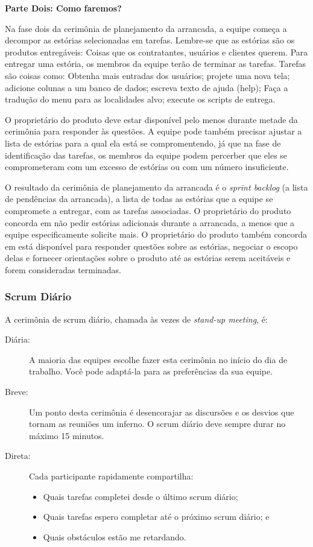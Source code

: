 \documentclass[
	11pt,				%
	openright,
	twoside,			%
	a4paper,			%
	english,			%
	french,
	brazil,				%
	sumario=tradicional
	]{abntex2}
\begin{document}
\noindent \textbf{\small Parte Dois: Como faremos?}

Na fase dois da cerimônia de planejamento da arrancada, a equipe começa a decompor as estórias selecionadas em tarefas. Lembre-se que as estórias são os produtos entregáveis: Coisas que os contratantes, usuários e clientes querem. Para entregar uma estória, os membros da equipe terão de terminar as tarefas. Tarefas são coisas como: Obtenha mais entradas dos usuários; projete uma nova tela; adicione colunas a um banco de dados; escreva texto de ajuda (help); Faça a tradução do menu para as localidades alvo; execute os scripts de entrega.

O proprietário do produto deve estar disponível pelo menos durante metade da cerimônia para responder às questões. A equipe pode também precisar ajustar a lista de estórias para a qual ela está se compromentendo, já que na fase de identificação das tarefas, os membros da equipe podem percerber que eles se comprometeram com um excesso de estórias ou com um número insuficiente.

O resultado da cerimônia de planejamento da arrancada é o \textit{sprint backlog} (a lista de pendências da arrancada), a lista de todas as estórias que a equipe se compromete a entregar, com as tarefas associadas. O proprietário do produto concorda em não pedir estórias adicionais durante a arrancada, a menos que a equipe especificamente solicite mais. O proprietário do produto também concorda em está disponível para responder questões sobre as estórias, negociar o escopo delas e fornecer orientações sobre o produto até as estórias serem aceitáveis e forem consideradas terminadas.

\subsubsection{Scrum Diário}

A cerimônia de scrum diário, chamada às vezes de \textit{stand-up meeting}, é:
\begin{description}
\item[Diária:] A maioria das equipes escolhe fazer esta cerimônia no início do dia de trabalho. Você pode adaptá-la para as preferências da sua equipe.
\item[Breve:] Um ponto desta cerimônia é desencorajar as discursões e os desvios que tornam as reuniões um inferno. O scrum diário deve sempre durar no máximo 15 minutos.
\item[Direta:] Cada participante rapidamente compartilha:
\begin{itemize}
\item Quais tarefas completei desde o último scrum diário;
\item Quais tarefas espero completar até o próximo scrum diário; e
\item Quais obstáculos estão me retardando.
\end{itemize}
\end{description}
\end{document}
